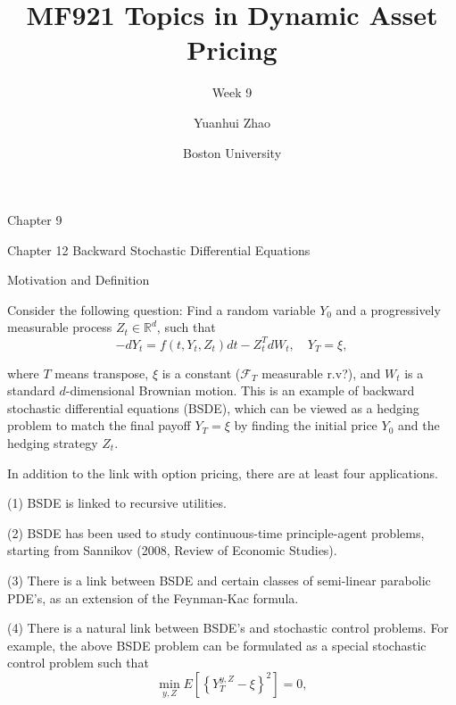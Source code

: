 \documentclass{beamer}
\title{MF921 Topics in Dynamic Asset Pricing}
\subtitle{Week 9}
\author{Yuanhui Zhao}
\date{Boston University}
\begin{document}
\frame{\titlepage}


\begin{frame}{Chapter 9}

    {
    \begin{center}
        Chapter 12 Backward Stochastic Differential Equations
    \end{center}
    }
    
\end{frame}

\begin{frame}{Motivation and Definition}

    {\footnotesize \footnotesize
Consider the following question: Find a random variable \( Y_0 \) and a progressively measurable process \( Z_t \in \mathbb{R}^d \), such that
\[
-dY_t = f(t, Y_t, Z_t)dt - Z_t^T dW_t, \quad Y_T = \xi,
\]

where \( T \) means transpose, \( \xi \) is a constant ($\mathcal{F}_T$ measurable r.v?), 
and \( W_t \) is a standard \( d \)-dimensional Brownian motion. 
This is an example of backward stochastic differential equations (BSDE), 
which can be viewed as a hedging problem to match the final payoff \( Y_T = \xi \) 
by finding the initial price \( Y_0 \) and the hedging strategy \( Z_t \).
\vspace{1em}
\par In addition to the link with option pricing, there are at least four applications.

(1) BSDE is linked to recursive utilities.

(2) BSDE has been used to study continuous-time principle-agent problems, starting from Sannikov (2008, Review of Economic Studies).

(3) There is a link between BSDE and certain classes of semi-linear parabolic PDE's, as an extension of the Feynman-Kac formula.

(4) There is a natural link between BSDE's and stochastic control problems. 
For example, the above BSDE problem can be formulated as a special stochastic control problem such that
\[
\min_{y,Z} E \left[ \left\{ Y_T^{y,Z} - \xi \right\}^2 \right] = 0,
\]
    }
    
\end{frame}
\end{document}
